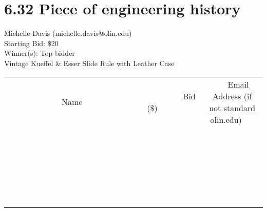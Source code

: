 \documentclass[11pt]{article}
\begin{document}
\section*{6.32 Piece of engineering history}
Michelle Davis (michelle.davis@olin.edu) \\
Starting Bid: \$20 \\
Winner(s): 
Top bidder \\
Vintage Kueffel \& Esser Slide Rule with Leather Case \\[6ex]
\begin{tabular}{c c c}
~~~~~~~~~~~~~Name~~~~~~~~~~~~~ & ~~~~~~~~~Bid (\$)~~~~~~~~~ & ~~~Email Address (if not standard olin.edu)~~~ \\
 & & \\
\hline
 & & \\
\hline
 & & \\
\hline
 & & \\
\hline
 & & \\
\hline
 & & \\
\hline
 & & \\
\hline
 & & \\
\hline
 & & \\
\hline
 & & \\
\hline
 & & \\
\hline
 & & \\
\hline
 & & \\
\hline
 & & \\
\hline
 & & \\
\hline
 & & \\
\hline
 & & \\
\hline
 & & \\
\hline
 & & \\
\hline
 & & \\
\hline
 & & \\
\hline
 & & \\
\hline
 & & \\
\hline
 & & \\
\hline
 & & \\
\hline
 & & \\
\hline
\end{tabular}
\clearpage
\end{document}

